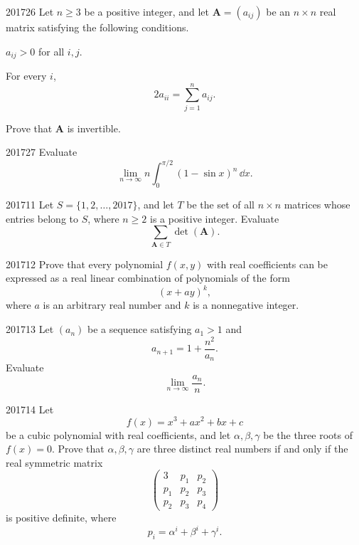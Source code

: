 \begin{problem}{2017}{2}{6}
Let $n\ge3$ be a positive integer, and let $\mathbf A=(a_{ij})$ be an $n\times n$ real matrix satisfying the following conditions.
\begin{problemclauses}
    \item $a_{ij}>0$ for all $i, j$.
    \item For every $i$,
    \[
        2a_{ii}=\sum_{j=1}^{n}a_{ij}.
    \]
\end{problemclauses}
Prove that $\mathbf A$ is invertible.
\end{problem}

\begin{problem}{2017}{2}{7}
Evaluate
\[
    \lim_{n\to\infty}
    n\int_0^{\pi/2}(1-\sin x)^n\, \dd x.
\]
\end{problem}

\begin{problem}{2017}{1}{1}
Let $S=\{1, 2, \dots, 2017\}$, and let $T$ be the set of all $n\times n$ matrices whose entries belong to $S$, where $n\ge2$ is a positive integer. Evaluate
\[
    \sum_{\mathbf A\in T}\det(\mathbf A).
\]
\end{problem}

\begin{problem}{2017}{1}{2}
Prove that every polynomial $f(x, y)$ with real coefficients can be expressed as a real linear combination of polynomials of the form
\[
    (x+ay)^k,
\]
where $a$ is an arbitrary real number and $k$ is a nonnegative integer.
\end{problem}

\begin{problem}{2017}{1}{3}
Let $(a_n)$ be a sequence satisfying $a_1>1$ and
\[
    a_{n+1}=1+\frac{n^2}{a_n}.
\]
Evaluate
\[
    \lim_{n\to\infty}\frac{a_n}{n}.
\]
\end{problem}

\begin{problem}{2017}{1}{4}
Let
\[
    f(x)=x^3+ax^2+bx+c
\]
be a cubic polynomial with real coefficients, and let $\alpha, \beta, \gamma$ be the three roots of $f(x)=0$. Prove that $\alpha, \beta, \gamma$ are three distinct real numbers if and only if the real symmetric matrix
\[
    \begin{pmatrix}
        3&p_1&p_2\\
        p_1&p_2&p_3\\
        p_2&p_3&p_4
    \end{pmatrix}
\]
is positive definite, where
\[
    p_i=\alpha^i+\beta^i+\gamma^i.
\]
\end{problem}

